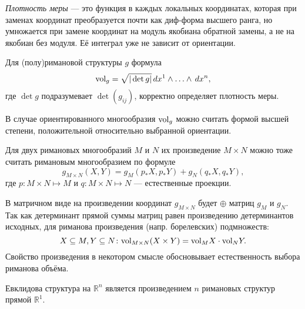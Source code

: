 \begin{to_def}
	\textit{Плотность меры} --- это функция в каждых локальных координатах, которая при заменах координат преобразуется почти как диф-форма высшего ранга, но умножается при замене координат на модуль якобиана обратной замены, а не на якобиан без модуля. Её интеграл уже не зависит от ориентации.
\end{to_def}

\begin{to_lem}
	Для (полу)римановой структуры $g$ формула
	\begin{equation*}
		\textnormal{vol}_g = \sqrt{|\det g|} \, d x^1 \wedge \ldots \wedge \, d x^n,
	\end{equation*}
	где $\det g$ подразумевает $\det (g_{i j})$, корректно определяет плотность меры.
\end{to_lem}

В случае ориентированного многообразия $\textnormal{vol}_{g}$ можно считать формой высшей степени, положительной  относительно выбранной ориентации.

Для двух римановых многообразий $M$ и $N$ их произведение $M \times N$ можно  тоже считать римановым многообразием по формуле
\begin{equation*}
	g_{M \times N}(X,Y) = g_{M}(p_*X, p_*Y) + g_{N}(q_*X, q_*Y),
\end{equation*}
где $p \colon M \times N \mapsto M$ и $q \colon M \times N \mapsto N$ --- естественные проекции.

В матричном виде на произведении координат $g_{M\times N}$ будет $\oplus$ матриц $g_M $ и $g_N$. Так как детерминант прямой суммы матриц равен произведению детерминантов исходных, для риманова произведения (напр. борелевских) подмножеств:
\begin{equation*}
	X \subseteq M, Y \subseteq N \colon
	\textnormal{vol}_{M \times N} (X \times Y) = \textnormal{vol}_M X \cdot  \textnormal{vol}_N Y.
\end{equation*}
Свойство произведения в некотором смысле обосновывает естественность выбора риманова объёма.

\begin{to_tas}
	Евклидова структура на $\mathbb{R}^n$ является произведением $n$ римановых структур прямой $\mathbb{R}^1$.
\end{to_tas}
